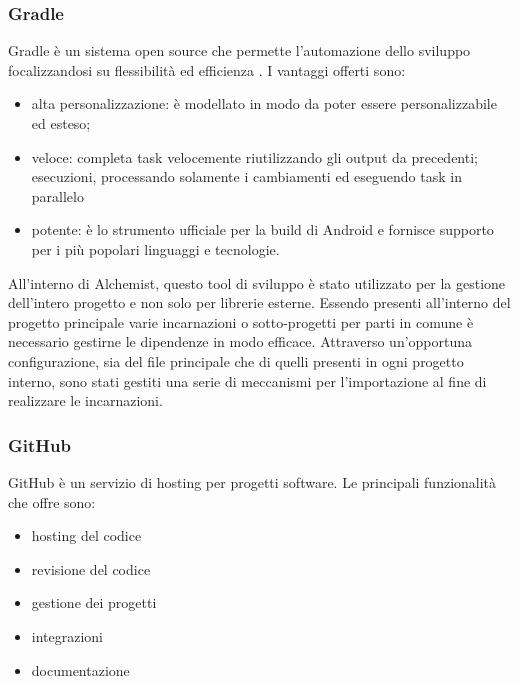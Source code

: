 \subsubsection{Gradle}
Gradle è un sistema open source che permette l'automazione dello sviluppo focalizzandosi su flessibilità ed efficienza \cite{Gradle}. I vantaggi offerti sono:
\begin{itemize}
\item alta personalizzazione: è modellato in modo da poter essere personalizzabile ed esteso;
\item veloce: completa task velocemente riutilizzando gli output da precedenti; esecuzioni, processando solamente i cambiamenti ed eseguendo task in parallelo
\item potente: è lo strumento ufficiale per la build di Android e fornisce supporto per i più popolari linguaggi e tecnologie.
\end{itemize}
All'interno di Alchemist, questo tool di sviluppo è stato utilizzato per la gestione dell'intero progetto e non solo per librerie esterne. Essendo presenti all'interno del progetto principale varie incarnazioni o sotto-progetti per parti in comune è necessario gestirne le dipendenze in modo efficace. Attraverso un'opportuna configurazione, sia del file principale che di quelli presenti in ogni progetto interno, sono stati gestiti una serie di meccanismi per l'importazione al fine di realizzare le incarnazioni.

\subsubsection{GitHub}
GitHub è un servizio di hosting per progetti software. Le principali funzionalità che offre sono:
\begin{itemize}
\item hosting del codice
\item revisione del codice
\item gestione dei progetti
\item integrazioni
\item documentazione
\end{itemize}

